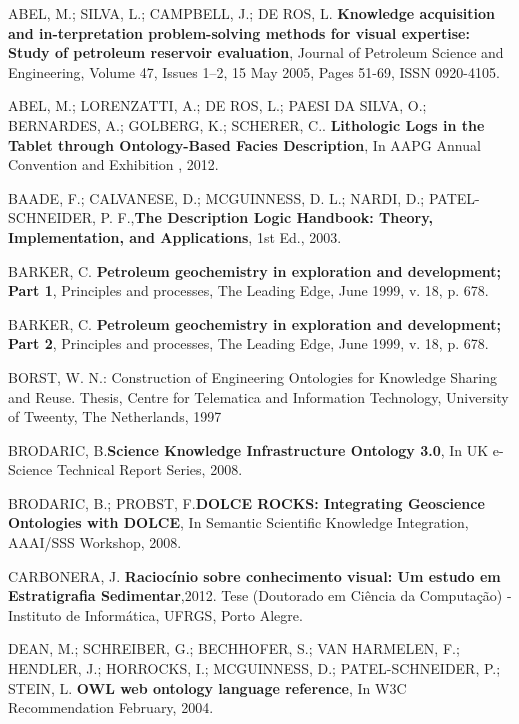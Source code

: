 \documentclass[ti]{iiufrgs}
\begin{document}
\begin{thebibliography}{este-parametro-nao-eh-usado-pelo-estilo-ABNT}

 ABEL, M.; SILVA, L.; CAMPBELL, J.; DE ROS, L.\@ \textbf{ Knowledge acquisition and in-terpretation problem-solving methods for visual expertise: Study of petroleum reservoir evaluation}, Journal of Petroleum Science and Engineering, Volume 47, Issues 1–2, 15 May 2005, Pages 51-69, ISSN 0920-4105.

ABEL, M.; LORENZATTI, A.; DE ROS, L.; PAESI DA SILVA, O.; BERNARDES, A.; GOLBERG, K.; SCHERER, C.\@. \textbf{Lithologic Logs in the Tablet through  Ontology-Based Facies Description}, In AAPG Annual Convention and Exhibition , 2012.

BAADE, F.; CALVANESE, D.; MCGUINNESS, D. L.; NARDI, D.; PATEL-SCHNEIDER, P. F.,\@ \textbf{The 	Description Logic Handbook: Theory, Implementation, and Applications},	1st Ed., 2003.

BARKER, C\@. \textbf{Petroleum geochemistry in exploration and development; Part 1}, 	Principles and processes, The Leading Edge, June 1999, v. 18, p. 678.

BARKER, C\@. \textbf{Petroleum geochemistry in exploration and development; Part 2}, 	Principles and processes, The Leading Edge, June 1999, v. 18, p. 678.

BORST, W. N.: Construction of Engineering Ontologies for Knowledge Sharing and Reuse. Thesis, Centre for Telematica and Information Technology, University of Tweenty, The Netherlands, 1997

BRODARIC, B.\@ \textbf{Science Knowledge Infrastructure Ontology 3.0}, In UK e-Science Technical Report Series, 2008.

BRODARIC, B.; PROBST, F.\@\textbf{DOLCE ROCKS: Integrating Geoscience Ontologies with DOLCE}, In Semantic Scientific Knowledge Integration, AAAI/SSS Workshop,  2008.

CARBONERA, J.\@\textbf{ Raciocínio sobre conhecimento visual: Um estudo em Estratigrafia 	Sedimentar},2012. Tese (Doutorado em Ciência da Computação) - Instituto de 	Informática, 	UFRGS, Porto Alegre.

DEAN, M.; SCHREIBER, G.; BECHHOFER, S.; VAN HARMELEN, F.; HENDLER, J.; HORROCKS, I.; MCGUINNESS, D.; PATEL-SCHNEIDER, P.; STEIN, L\@. \textbf{OWL web ontology language reference}, In W3C Recommendation February, 2004.


\end{thebibliography}
\end{document}
